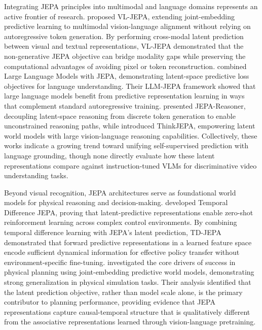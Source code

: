 Integrating JEPA principles into multimodal and language domains represents an active frontier of research. \citet{chen2026vljepa} proposed VL-JEPA, extending joint-embedding predictive learning to multimodal vision-language alignment without relying on autoregressive token generation. By performing cross-modal latent prediction between visual and textual representations, VL-JEPA demonstrated that the non-generative JEPA objective can bridge modality gaps while preserving the computational advantages of avoiding pixel or token reconstruction. \citet{huang2025llmjepa} combined Large Language Models with JEPA, demonstrating latent-space predictive loss objectives for language understanding. Their LLM-JEPA framework showed that large language models benefit from predictive representation learning in ways that complement standard autoregressive training. \citet{liu2026jepareasoner} presented JEPA-Reasoner, decoupling latent-space reasoning from discrete token generation to enable unconstrained reasoning paths, while \citet{zhang2026thinkjepa} introduced ThinkJEPA, empowering latent world models with large vision-language reasoning capabilities. Collectively, these works indicate a growing trend toward unifying self-supervised prediction with language grounding, though none directly evaluate how these latent representations compare against instruction-tuned VLMs for discriminative video understanding tasks.

Beyond visual recognition, JEPA architectures serve as foundational world models for physical reasoning and decision-making. \citet{bagatella2025tdjepa} developed Temporal Difference JEPA, proving that latent-predictive representations enable zero-shot reinforcement learning across complex control environments. By combining temporal difference learning with JEPA's latent prediction, TD-JEPA demonstrated that forward predictive representations in a learned feature space encode sufficient dynamical information for effective policy transfer without environment-specific fine-tuning. \citet{terver2026physicaljepa} investigated the core drivers of success in physical planning using joint-embedding predictive world models, demonstrating strong generalization in physical simulation tasks. Their analysis identified that the latent prediction objective, rather than model scale alone, is the primary contributor to planning performance, providing evidence that JEPA representations capture causal-temporal structure that is qualitatively different from the associative representations learned through vision-language pretraining.

